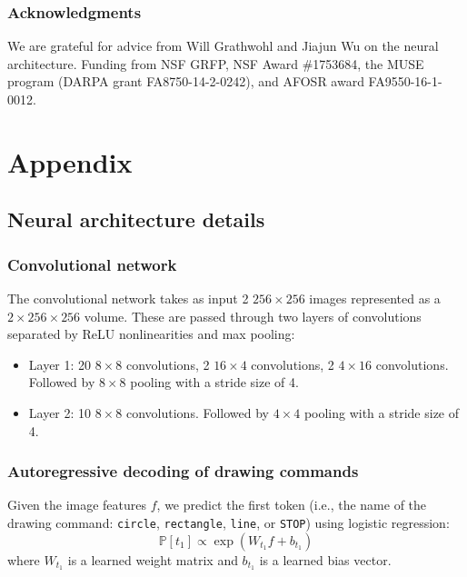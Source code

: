 \documentclass{article}
\newcommand{\probability}{\mathds{P}} %
\theoremstyle{definition}
\begin{document}
\subsubsection*{Acknowledgments} We are grateful for advice from Will Grathwohl and Jiajun Wu on  the neural architecture. Funding from NSF GRFP, NSF Award 
\#1753684, the MUSE program (DARPA grant FA8750-14-2-0242),
and AFOSR award FA9550-16-1-0012.


 
{\small } 


\appendix

\section{Appendix}

\subsection{Neural architecture details}\label{architectureDetails}

\subsubsection{Convolutional network}
The convolutional network takes as input 2 $256\times 256$ images
represented as a $2\times 256\times 256$ volume. These are
passed through two layers of convolutions separated by ReLU
nonlinearities and max pooling:
\begin{itemize}
\item Layer 1: 20 $8\times 8$ convolutions, 2 $16\times 4$ convolutions, 2 $4\times 16$ convolutions. Followed by $8\times 8$ pooling with a stride size of 4.
\item Layer 2: 10 $8\times 8$ convolutions. Followed by $4\times 4$ pooling with a stride size of 4.
\end{itemize}


\subsubsection{Autoregressive decoding of drawing commands}

Given the image features $f$, we predict the first token (i.e., the name of the drawing command: \verb|circle|, \verb|rectangle|, \verb|line|, or \verb|STOP|) using logistic regression:
\begin{equation}
  \probability [t_1]\propto \exp\left( W_{t_1}f + b_{t_1}\right)
\end{equation}
where $W_{t_1}$ is a learned weight matrix and  $b_{t_1}$ is a learned bias vector.
\end{document}
